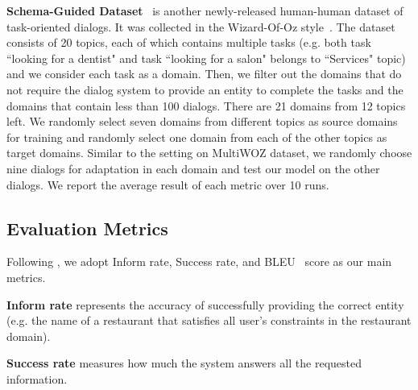 \documentclass[letterpaper]{article} %
\begin{document}
\noindent\textbf{Schema-Guided Dataset}~\citep{rastogi2019towards} is another newly-released human-human dataset of task-oriented dialogs. It was collected in the Wizard-Of-Oz style~\citep{Kelley1984AnID}. The dataset consists of 20 topics, each of which contains multiple tasks (e.g. both task ``looking for a dentist" and task ``looking for a salon" belongs to ``Services" topic) and we consider each task as a domain. Then, we filter out the domains that do not require the dialog system to provide an entity to complete the tasks and the domains that contain less than 100 dialogs. There are 21 domains from 12 topics left. We randomly select seven domains from different topics as source domains for training and randomly select one domain from each of the other topics as target domains. Similar to the setting on MultiWOZ dataset, we randomly choose nine dialogs for adaptation in each domain and test our model on the other dialogs. We report the average result of each metric over 10 runs.



\subsection*{Evaluation Metrics}

Following \citet{budzianowski2018multiwoz}, we adopt Inform rate, Success rate, and BLEU~\citep{Papineni2002BleuAM} score as our main metrics.

\noindent\textbf{Inform rate} represents the accuracy of successfully providing the correct entity (e.g. the name of a restaurant that satisfies all user's constraints in the restaurant domain).

\noindent\textbf{Success rate} measures how much the system answers all the requested information.
\end{document}
